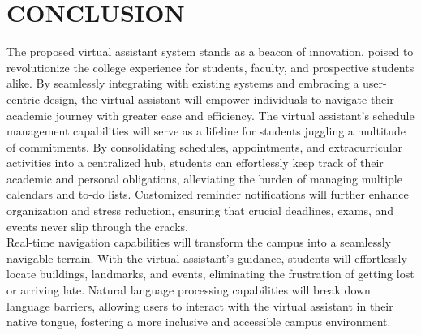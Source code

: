 \documentclass[12pt,a4paper]{report}
\begin{document}
\chapter{CONCLUSION}
The proposed virtual assistant system stands as a beacon of innovation, poised to revolutionize the college experience for students, faculty, and prospective students alike. By seamlessly integrating with existing systems and embracing a user-centric design, the virtual assistant will empower individuals to navigate their academic journey with greater ease and efficiency. The virtual assistant's schedule management capabilities will serve as a lifeline for students juggling a multitude of commitments. By consolidating schedules, appointments, and extracurricular activities into a centralized hub, students can effortlessly keep track of their academic and personal obligations, alleviating the burden of managing multiple calendars and to-do lists. Customized reminder notifications will further enhance organization and stress reduction, ensuring that crucial deadlines, exams, and events never slip through the cracks.\\
\hspace*{35pt}Real-time navigation capabilities will transform the campus into a seamlessly navigable terrain. With the virtual assistant's guidance, students will effortlessly locate buildings, landmarks, and events, eliminating the frustration of getting lost or arriving late. Natural language processing capabilities will break down language barriers, allowing users to interact with the virtual assistant in their native tongue, fostering a more inclusive and accessible campus environment.
\end{document}
